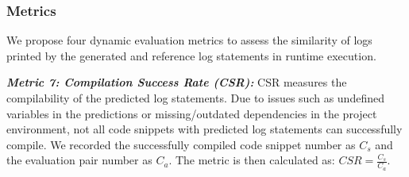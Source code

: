 

\subsubsection{Metrics}
\label{sect:method_dynamic_metrics}
We propose four dynamic evaluation metrics to assess the similarity of logs printed by the generated and reference log statements in runtime execution.

\textit{\textbf{Metric 7: Compilation Success Rate (CSR):}} CSR measures the compilability of the predicted log statements. Due to issues such as undefined variables in the predictions or missing/outdated dependencies in the project environment, not all code snippets with predicted log statements can successfully compile.  We recorded the successfully compiled code snippet number as \(C_s\) and the evaluation pair number as \(C_a\). The metric is then calculated as: \(CSR = \frac{C_s}{C_a}\).
 
